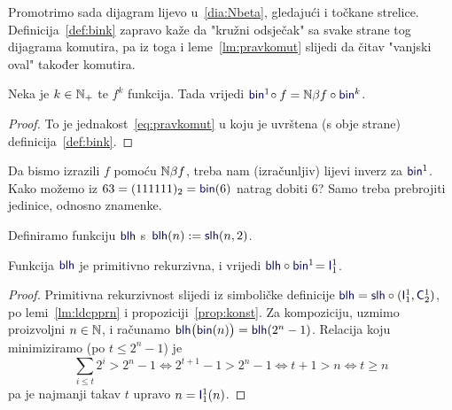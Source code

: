
Promotrimo sada dijagram lijevo u~\eqref{dia:Nbeta}, gledajući i točkane strelice. Definicija~\ref{def:bink} zapravo kaže da "kružni odsječak" sa svake strane tog dijagrama komutira, pa iz toga i leme~\ref{lm:pravkomut} slijedi da čitav "\!vanjski oval" također komutira.

\begin{korolar}[{name=[brojevni-brojevni dijagram komutira]}]\label{kor:binf=Nbetafbin}
Neka je $k\in{\mathbb N}_+$ te $f^k$ funkcija. Tada vrijedi
    $\f{bin}^1\!\circ f=\N\beta f\circ\f{bin}^k$.
\end{korolar}
\begin{proof}
To je jednakost~\eqref{eq:pravkomut} u koju je uvrštena (s obje strane) definicija~\ref{def:bink}.
\end{proof}


Da bismo izrazili $f$ pomoću ${\mathbb N}\beta f$, treba nam (izračunljiv) lijevi inverz za $\f{bin}^1$. Kako možemo iz $63=(111111)_2=\f{bin}(6)$ natrag dobiti $6$? Samo treba prebrojiti jedinice, odnosno znamenke.

\begin{lema}[{name=[primitivna rekurzivnost i specifikacija duljine binarnog zapisa]}]\label{lm:blh}
Definiramo funkciju $\f{blh}$ s\, $\f{blh}(n):=\f{slh}(n,2)$. 

Funkcija $\f{blh}$ je primitivno rekurzivna, i vrijedi $\f{blh}\circ\f{bin}^1\!=\f I_1^1$.
\end{lema}
\begin{proof}
Primitivna rekurzivnost slijedi iz simboličke definicije $\f{blh}=\f{slh}\circ(\f I_1^1,\f C_2^1)$, po lemi~\ref{lm:ldcpprn} i propoziciji~\ref{prop:konst}.
Za kompoziciju, uzmimo proizvoljni $n\in{\mathbb N}$, i računamo $\f{blh}\bigl(\f{bin}(n)\bigr)=\f{blh}(2^n-1)$. Relacija koju minimiziramo (po $t\le 2^n-1$) je
\begin{equation}
    \textstyle\sum_{i\le t}2^i>2^n-1
    \Longleftrightarrow
    2^{t+1}-1>2^n-1
    \Longleftrightarrow
    t+1>n
    \Longleftrightarrow
    t\ge n
\end{equation}
pa je najmanji takav $t$ upravo $n=\f I_1^1(n)$.\qedhere
\end{proof}

